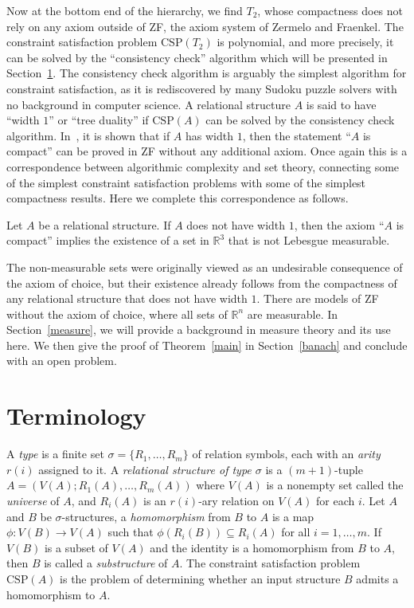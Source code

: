 \documentclass{lmcs}
\begin{document}
Now at the bottom end of the hierarchy, we find $T_2$, whose compactness does not rely on any axiom
outside of ZF, the axiom system of Zermelo and Fraenkel. The constraint satisfaction problem $\mbox{CSP}(T_2)$
is polynomial, and more precisely, it can be solved by the ``consistency check'' algorithm which will
be presented in Section~\ref{overview}. The consistency check algorithm is arguably the simplest algorithm
for constraint satisfaction, as it is rediscovered by many Sudoku puzzle solvers with no background in computer science.
A relational structure $A$ is said to have ``width $1$'' or ``tree duality'' if $\mbox{CSP}(A)$ can be solved 
by the consistency check algorithm. In~\cite{rtw}, it is shown that if $A$ has width $1$, then 
the statement ``$A$ is compact'' can be proved  in ZF without any
additional axiom. Once again this is a correspondence between algorithmic complexity and
set theory, connecting some of the simplest constraint satisfaction problems with some of the
simplest compactness results. Here we complete this correspondence as follows.
\begin{thm}\label{main}
Let $A$ be a relational structure. If $A$ does not have width $1$, then the axiom ``$A$ is compact''
implies the existence of a set in $\mathbb{R}^3$
that is not Lebesgue measurable.
\end{thm}
\noindent
The non-measurable sets were originally viewed as an undesirable
consequence of the axiom of choice, but their existence already
follows from the compactness of any relational structure that
does not have width $1$. There are models of ZF without the 
axiom of choice, where all sets of $\mathbb{R}^n$ are measurable.
In Section~\ref{measure}, we will provide a
background in measure theory and its use here.
We then give the proof of Theorem~\ref{main} in 
Section~\ref{banach} and conclude with an open problem.

\section{Terminology} \label{overview}
A {\em type} is a finite set $\sigma = \{R_1,\dots,R_m\}$ of 
relation symbols, each with  an {\em arity}  $r(i)$ assigned to it. 
A {\em relational structure of type $\sigma$} is a $(m+1)$-tuple
$A = (V(A);R_1(A),\dots,R_m(A))$ where $V(A)$ 
is a nonempty set called the {\em universe} of $A$, and 
$R_i(A)$ is an $r(i)$-ary relation on $V(A)$ for each $i$.
Let $A$ and $B$ be $\sigma$-structures,
a {\em homomorphism} from $B$ to $A$ is a map 
$\phi: V(B) \rightarrow V(A)$ such that $\phi(R_i(B)) 
\subseteq R_i(A)$ for all $i=1,\dots,m$.
If $V(B)$ is a subset of $V(A)$ and the identity is
a homomorphism from $B$ to $A$,
then $B$ is called a {\em substructure} of $A$.
The constraint satisfaction problem $\mbox{CSP}(A)$
is the problem of determining whether an input structure $B$ admits 
a homomorphism to $A$.
\end{document}
